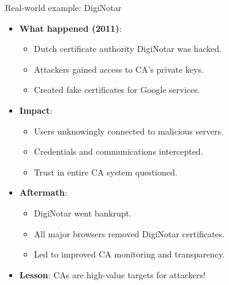 \ifdefined\PRESENTATION\else\PassOptionsToClass{handout}{beamer}\fi\documentclass[aspectratio=169, lualatex]{beamer}
\begin{document}
\begin{frame}{Real-world example: DigiNotar}
	\begin{itemize}[<+->]
		\item \textbf{What happened (2011)}:
		      \begin{itemize}
			      \item Dutch certificate authority DigiNotar was hacked.
			      \item Attackers gained access to CA's private keys.
			      \item Created fake certificates for Google services.
		      \end{itemize}
		\item \textbf{Impact}:
		      \begin{itemize}
			      \item Users unknowingly connected to malicious servers.
			      \item Credentials and communications intercepted.
			      \item Trust in entire CA system questioned.
		      \end{itemize}
		\item \textbf{Aftermath}:
		      \begin{itemize}
			      \item DigiNotar went bankrupt.
			      \item All major browsers removed DigiNotar certificates.
			      \item Led to improved CA monitoring and transparency.
		      \end{itemize}
		\item \textbf{Lesson}: CAs are high-value targets for attackers!
	\end{itemize}
\end{frame}
\end{document}
